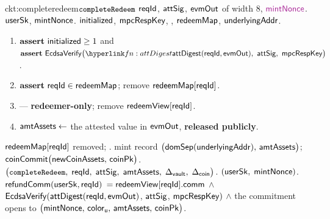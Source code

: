 \begin{CktBox}{ckt:completeredeem}{$\texttt{\small completeRedeem}$}
 $\mathsf{reqId}$, $\mathsf{attSig}$, $\mathsf{evmOut}$ of width $8$, $\freshrn{\mintNonce}$.
 $\mathsf{userSk}$, $\mathsf{mintNonce}$.
 $\mathsf{initialized}$, $\mathsf{mpcRespKey}$, \ADDEDINL{$\redeemView[\rid]$}, $\mathsf{redeemMap}$,
$\mathsf{underlyingAddr}$.
\begin{enumerate}[nosep,leftmargin=1.7em,topsep=2pt]
\item $\textbf{assert}~ \mathsf{initialized} \geq 1$ and
      $\assert \EcdsaVf\bigl(\lnk{fn:attDigest}{\attDigest(\rid, \evmOut)}\bc \attSig\bc
      \mpcRespKey\bigr)$.
\item $\textbf{assert}~ \mathsf{reqId} \in \mathsf{redeemMap}$; \; remove $\mathsf{redeemMap}[\mathsf{reqId}]$.
\item {} --- \textbf{redeemer-only}; \; remove $\redeemView[\rid]$.
\item $\mathsf{amtAssets} \gets$ the attested value in $\mathsf{evmOut}$, \textbf{released publicly}.
\end{enumerate}
\begin{OutList}
\oitem{\Dvault} $\mathsf{redeemMap}[\mathsf{reqId}]$ removed; .
\oitem{\Dshd} \bluedot mint record $\bigl(\mathsf{domSep}(\mathsf{underlyingAddr}),\, \mathsf{amtAssets}\bigr)$; \;
  \bluedot $\mathsf{coinCommit}\bigl(\mathsf{newCoinAssets},\, \mathsf{coinPk}\bigr)$.
\oitem{\stmt} $\bigl(\texttt{\small completeRedeem},\; \mathsf{reqId},\; \mathsf{attSig},\; \mathsf{amtAssets},\; \Delta_{\mathsf{vault}},\;
  \Delta_{\mathsf{coin}}\bigr)$.
\oitem{\wit} $(\mathsf{userSk},\; \mathsf{mintNonce})$.
\oitem{\Rel} $\mathsf{refundComm}(\mathsf{userSk}, \mathsf{reqId})$ $= \mathsf{redeemView}[\mathsf{reqId}].\mathsf{comm}$ \;$\wedge$\;
  $\mathsf{EcdsaVerify}(\mathsf{attDigest}(\mathsf{reqId},\mathsf{evmOut})$, $\mathsf{attSig}$, $\mathsf{mpcRespKey})$ \;$\wedge$\;
  the commitment opens to
  $\bigl(\mathsf{mintNonce},\, \mathsf{color}_{\mathsf{u}},\, \mathsf{amtAssets},\, \mathsf{coinPk}\bigr)$.
\end{OutList}
\end{CktBox}


